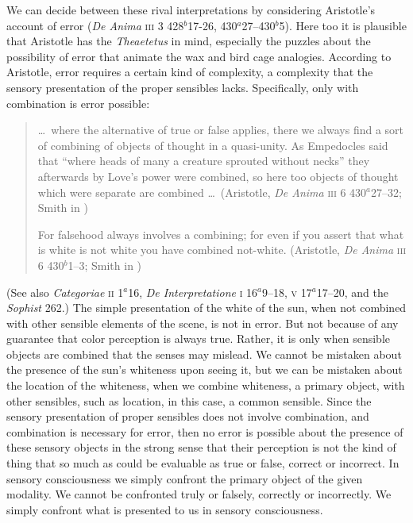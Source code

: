 \documentclass[12pt]{article}
\begin{document}
We can decide between these rival interpretations by considering Aristotle's account of error (\emph{De Anima} \textsc{iii} 3 428\( ^{b} \)17-26, 430\( ^{a} \)27--430\( ^{b} \)5). Here too it is plausible that Aristotle has the \emph{Theaetetus} in mind, especially the puzzles about the possibility of error that animate the wax and bird cage analogies. According to Aristotle, error requires a certain kind of complexity, a complexity that the sensory presentation of the proper sensibles lacks. Specifically, only with combination is error possible:
\begin{quote}
	\ldots\ where the alternative of true or false applies, there we always find a sort of combining of objects of thought in a quasi-unity. As Empedocles said that ``where heads of many a creature sprouted without necks'' they afterwards by Love’s power were combined, so here too objects of thought which were separate are combined \ldots\ (Aristotle, \emph{De Anima} \textsc{iii} 6 430\( ^{a} \)27--32; Smith in \citealt[54]{Barnes:1984uq})
	
	For falsehood always involves a combining; for even if you assert that what is white is not white you have combined not-white. (Aristotle, \emph{De Anima} \textsc{iii} 6 430\( ^{b} \)1--3; Smith in \citealt[54]{Barnes:1984uq})
\end{quote}
(See also \emph{Categoriae} \textsc{ii} 1\( ^{a} \)16, \emph{De Interpretatione} \textsc{i} 16\( ^{a} \)9--18, \textsc{v} 17\( ^{a} \)17--20, and the \emph{Sophist} 262.) The simple presentation of the white of the sun, when not combined with other sensible elements of the scene, is not in error. But not because of any guarantee that color perception is always true. Rather, it is only when sensible objects are combined that the senses may mislead. We cannot be mistaken about the presence of the sun's whiteness upon seeing it, but we can be mistaken about the location of the whiteness, when we combine whiteness, a primary object, with other sensibles, such as location, in this case, a common sensible. Since the sensory presentation of proper sensibles does not involve combination, and combination is necessary for error, then no error is possible about the presence of these sensory objects in the strong sense that their perception is not the kind of thing that so much as could be evaluable as true or false, correct or incorrect. In sensory consciousness we simply confront the primary object of the given modality. We cannot be confronted truly or falsely, correctly or incorrectly. We simply confront what is presented to us in sensory consciousness. 
\end{document}
